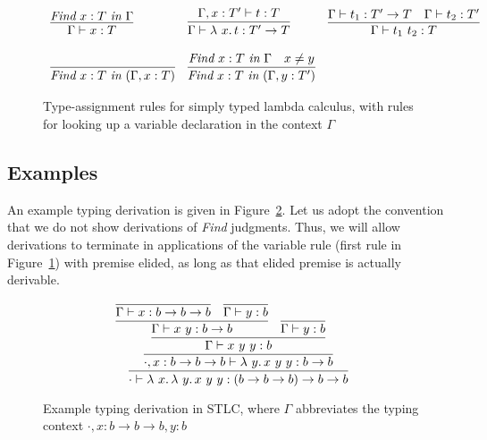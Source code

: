 \begin{figure}
\[
\begin{array}{lll}
\infer{\Gamma\vdash x : T}{\textit{Find}\ x:T\ \textit{in}\ \Gamma} 

&

\infer{\Gamma\vdash \lam{x}{t} : T' \to T}
      {\Gamma,x:T'\vdash t:T}

&

\infer{\Gamma\vdash t_1\ t_2 : T}
      {\Gamma\vdash t_1 : T' \to T &
       \Gamma\vdash t_2 : T'}
      \\
      \\

\infer{\textit{Find}\ x:T\ \textit{in}\ (\Gamma, x:T)}{\ }

&

\infer{\textit{Find}\ x:T\ \textit{in}\ (\Gamma, y:T')}{\textit{Find}\ x:T\ \textit{in}\ \Gamma & x \neq y}

&

\ 
\end{array}
\]
\caption{Type-assignment rules for simply typed lambda calculus, with rules for looking up a variable declaration in the context $\Gamma$}
\label{fig:stlctpassign}
\end{figure}

\subsection{Examples}

An example typing derivation is given in Figure~\ref{fig:stlcex}.  Let us adopt the convention that
we do not show derivations of \textit{Find} judgments.  Thus, we will allow derivations to terminate
in applications of the variable rule (first rule in Figure~\ref{fig:stlctpassign}) with premise elided, as long
as that elided premise is actually derivable.

\begin{figure}
  \[
  \infer{\cdot \vdash \lam{x}{\lam{y}{x\ y\ y}} : (b \to b \to b) \to b \to b}
        {\infer{\cdot,x:b \to b \to b \vdash \lam{y}{x\ y\ y} : b \to b}
          {\infer{\Gamma \vdash x\ y\ y : b}
            {\infer{\Gamma \vdash x\ y : b \to b}
              {\infer{\Gamma \vdash x : b \to b \to b}{\ }
              & \infer{\Gamma \vdash y : b}{\ }}
            &\infer{\Gamma \vdash y : b}{\ }}}}
  \]
\caption{Example typing derivation in STLC, where $\Gamma$ abbreviates the typing context $\cdot,x:b \to b \to b, y : b$}
\label{fig:stlcex}
\end{figure}

